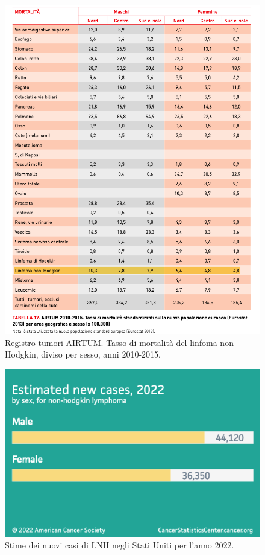 \begin{figure}[H]
    \begin{center}
    \includegraphics[width=0.8\columnwidth]{img/MORTALITA.png}
    \vspace{-3mm}
    \end{center}
    \caption{Registro tumori AIRTUM. Tasso di mortalità del linfoma non-Hodgkin, diviso per sesso, anni 2010-2015.
    \cite{img4-6-7}}

\end{figure}

\begin{figure}[H]
    \begin{center}
    \includegraphics[width=0.5\columnwidth]{img/Estimatednewcases2022.png}
    \vspace{-3mm}
    \end{center}
    \caption{Stime dei nuovi casi di LNH negli Stati Uniti per l’anno 2022.
    \cite{Americanstatistic}}
    \label{fig:FIGURE_2.7}
\end{figure}

